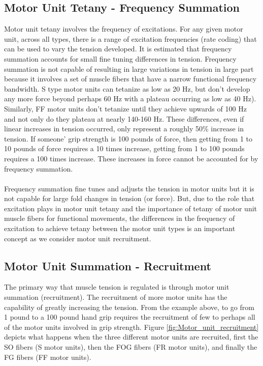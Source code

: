 \subsection{Motor Unit Tetany - Frequency Summation}

Motor unit tetany involves the frequency of excitations. For any given motor unit, across all types, there is a range of excitation frequencies (rate coding) that can be used to vary the tension developed. It is estimated that frequency summation accounts for small fine tuning differences in tension. Frequency summation is not capable of resulting in large variations in tension in large part because it involves a set of muscle fibers that have a narrow functional frequency bandwidth. S type motor units can tetanize as low as 20 Hz, but don't develop any more force beyond perhaps 60 Hz with a plateau occurring as low as 40 Hz). Similarly, FF motor units don't tetanize until they achieve upwards of 100 Hz and not only do they plateau at nearly 140-160 Hz. These differences, even if linear increases in tension occurred, only represent a roughly 50\% increase in tension. If someone' grip strength is 100 pounds of force, then getting from 1 to 10 pounds of force requires a 10 times increase, getting from 1 to 100 pounds requires a 100 times increase. These increases in force cannot be accounted for by frequency summation.

\paragraph{}

Frequency summation fine tunes and adjusts the tension in motor units but it is not capable for large fold changes in tension (or force). But, due to the role that excitation plays in motor unit tetany and the importance of tetany of motor unit muscle fibers for functional movements, the differences in the frequency of excitation to achieve tetany between the motor unit types is an important concept as we consider motor unit recruitment.

\subsection{Motor Unit Summation - Recruitment}

The primary way that muscle tension is regulated is through motor unit summation (recruitment). The recruitment of more motor units has the capability of greatly increasing the tension. From the example above, to go from 1 pound to a 100 pound hand grip requires the recruitment of few to perhaps all of the motor units involved in grip strength. Figure \ref{fig:Motor_unit_recruitment} depicts what happens when the three different motor units are recruited, first the SO fibers (S motor units), then the FOG fibers (FR motor units), and finally the FG fibers (FF motor units).\footnotemark{}


